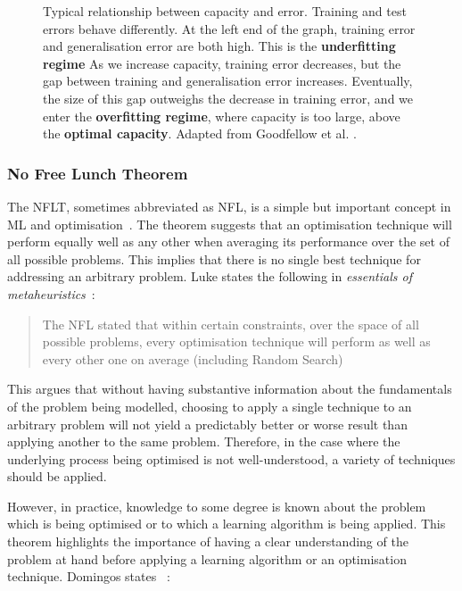 \begin{figure}[htp]
    \centering
    
    \captionsetup{format=hang} %
    \caption{
        Typical relationship between capacity and error. Training and test errors behave differently. At the left end of the graph, training error and generalisation error are both high. This is the \textbf{underfitting regime} As we increase capacity, training error decreases, but the gap between training and generalisation error increases. Eventually, the size of this gap outweighs the decrease in training error, and we enter the \textbf{overfitting regime}, where capacity is too large, above the \textbf{optimal capacity}. Adapted from Goodfellow et al. \cite{Goodfellow-et-al-2016}. 
        }
    \label{fig:capacity}
\end{figure}

\subsubsection{No Free Lunch Theorem}\label{ssec:no_free_lunch}

The \gls{NFLT}, sometimes abbreviated as \gls{NFL}, is a simple but important concept in \gls{ML} and optimisation~\cite{Wolpert1997}. The theorem suggests that an optimisation technique will perform equally well as any other when averaging its performance over the set of all possible problems. This implies that there is no single best technique for addressing an arbitrary problem. Luke states the following in \textit{essentials of metaheuristics}~\cite{luke2012essentials}:

\begin{quote}
    The \gls{NFL} stated that within certain constraints, over the space of all possible problems, every optimisation technique will perform as well as every other one on average (including Random Search)
\end{quote}

This argues that without having substantive information about the fundamentals of the problem being modelled, choosing to apply a single technique to an arbitrary problem will not yield a predictably better or worse result than applying another to the same problem. Therefore, in the case where the underlying process being optimised is not well-understood, a variety of techniques should be applied.

However, in practice, knowledge to some degree is known about the problem which is being optimised or to which a learning algorithm is being applied. This theorem highlights the importance of having a clear understanding of the problem at hand before applying a learning algorithm or an optimisation technique. Domingos states ~\cite{Domingos15}:


